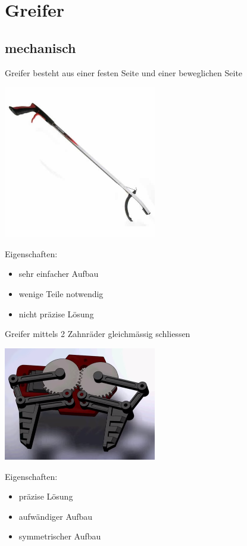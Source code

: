 \section{Greifer}
\subsection{mechanisch}
Greifer besteht aus einer festen Seite und einer beweglichen Seite

\includegraphics[width=0.5\textwidth]{Images/Gripper6.png}

Eigenschaften: 
\begin{itemize}
\item sehr einfacher Aufbau
\item wenige Teile notwendig
\item nicht präzise Lösung
\end{itemize}

Greifer mittels 2 Zahnräder gleichmässig schliessen

\includegraphics[width=0.5\textwidth]{Images/Gripper2.png}

Eigenschaften:
\begin{itemize}
\item präzise Lösung
\item aufwändiger Aufbau
\item symmetrischer Aufbau
\end{itemize}

